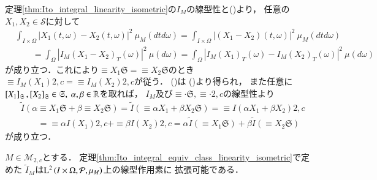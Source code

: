 	\begin{prf}
		定理\ref{thm:Ito_integral_linearity_isometric}の$I_M$の線型性と()より，
		任意の$X_1,X_2 \in \mathcal{S}$に対して
		\begin{align}
			&\int_{I \times \Omega} \left| X_1(t,\omega) - X_2(t,\omega) \right|^2\ \mu_M(dtd\omega)
			= \int_{I \times \Omega} \left| (X_1 - X_2)(t,\omega) \right|^2\ \mu_M(dtd\omega) \\
			&\qquad = \int_\Omega \left| I_M(X_1 - X_2)_T(\omega) \right|^2\ \mu(d\omega)
			= \int_\Omega \left| I_M(X_1)_T(\omega) - I_M(X_2)_T(\omega) \right|^2\ \mu(d\omega)
		\end{align}
		が成り立つ．これにより$\equiv{X_1}{\mathfrak{S}} = \equiv{X_2}{\mathfrak{S}}$のとき
		$\equiv{I_M(X_1)}{2,c} = \equiv{I_M(X_2)}{2,c}$が従う．
		()は
		()より得られ，
		また任意に$\left[X_1\right]_{\mathfrak{S}},\left[X_2\right]_{\mathfrak{S}} \in \mathfrak{S},\ \alpha,\beta \in \mathbb{R}$を取れば，
		$I_M$及び$\equiv{\cdot}{\mathfrak{S}},\equiv{\cdot}{2,c}$の線型性より
		\begin{align}
			&\tilde{I}\left( \alpha \equiv{X_1}{\mathfrak{S}} + \beta \equiv{X_2}{\mathfrak{S}} \right)
			= \tilde{I}\left( \equiv{\alpha X_1 + \beta X_2}{\mathfrak{S}} \right)
			= \equiv{I(\alpha X_1 + \beta X_2)}{2,c} \\
			&\qquad = \equiv{\alpha I(X_1)}{2,c} + \equiv{\beta I(X_2)}{2,c}
			= \alpha \tilde{I}\left( \equiv{X_1}{\mathfrak{S}} \right) + \beta \tilde{I}\left( \equiv{X_2}{\mathfrak{S}} \right)
		\end{align}
		が成り立つ．
		\QED
	\end{prf}
	
	\begin{screen}
		\begin{thm}[同値類に対する伊藤積分の拡張]
			$M \in \mathcal{M}_{2,c}$とする．
			定理\ref{thm:Ito_integral_equiv_class_linearity_isometric}で定めた
			$\tilde{I}_M$は$\operatorname{L}^{2} \left(I \times \Omega,\mathcal{P},\mu_M\right)$上の線型作用素に
			拡張可能である．
			\label{thm:expansion_of_Ito_integral_equiv_class}
		\end{thm}
	\end{screen}
	
